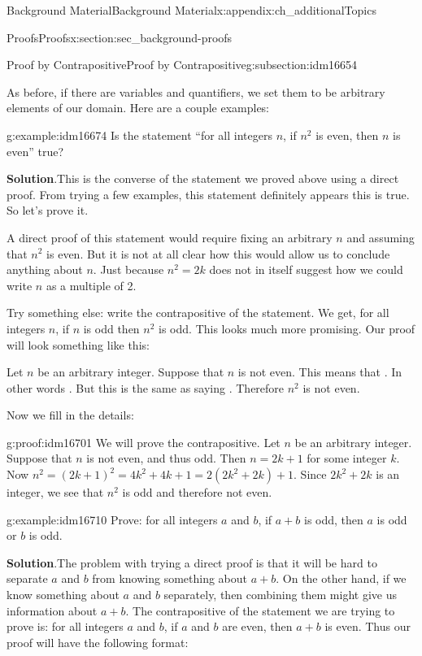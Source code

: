 \documentclass[oneside,10pt,]{book}
\numberwithin{equation}{chapter}
\begin{document}
\begin{appendixptx}{Background Material}{}{Background Material}{}{}{x:appendix:ch_additionalTopics}
\begin{sectionptx}{Proofs}{}{Proofs}{}{}{x:section:sec_background-proofs}
\begin{subsectionptx}{Proof by Contrapositive}{}{Proof by Contrapositive}{}{}{g:subsection:idm16654}
\begin{quote}
\end{quote}
As before, if there are variables and quantifiers, we set them to be arbitrary elements of our domain. Here are a couple examples:%
\begin{example}{}{g:example:idm16674}%
Is the statement ``for all integers \(n\), if \(n^2\) is even, then \(n\) is even'' true?%
\par\smallskip%
\noindent\textbf{Solution}.\hypertarget{g:solution:idm16681}{}\quad{}This is the converse of the statement we proved above using a direct proof. From trying a few examples, this statement definitely appears this is true. So let's prove it.%
\par
A direct proof of this statement would require fixing an arbitrary \(n\) and assuming that \(n^2\) is even. But it is not at all clear how this would allow us to conclude anything about \(n\). Just because \(n^2 = 2k\) does not in itself suggest how we could write \(n\) as a multiple of 2.%
\par
Try something else: write the contrapositive of the statement. We get, for all integers \(n\), if \(n\) is odd then \(n^2\) is odd. This looks much more promising. Our proof will look something like this:%
\par
Let \(n\) be an arbitrary integer. Suppose that \(n\) is not even. This means that \textellipsis{}. In other words \textellipsis{}. But this is the same as saying \textellipsis{}. Therefore \(n^2\) is not even.%
\par
Now we fill in the details:%
\begin{proofptx}{}{g:proof:idm16701}
We will prove the contrapositive. Let \(n\) be an arbitrary integer. Suppose that \(n\) is not even, and thus odd. Then \(n= 2k+1\) for some integer \(k\). Now \(n^2 = (2k+1)^2 = 4k^2 + 4k + 1 = 2(2k^2 + 2k) + 1\). Since \(2k^2 + 2k\) is an integer, we see that \(n^2\) is odd and therefore not even.%
\end{proofptx}
\end{example}
\begin{example}{}{g:example:idm16710}%
Prove: for all integers \(a\) and \(b\), if \(a + b\) is odd, then \(a\) is odd or \(b\) is odd.%
\par\smallskip%
\noindent\textbf{Solution}.\hypertarget{g:solution:idm16718}{}\quad{}The problem with trying a direct proof is that it will be hard to separate \(a\) and \(b\) from knowing something about \(a+b\). On the other hand, if we know something about \(a\) and \(b\) separately, then combining them might give us information about \(a+b\). The contrapositive of the statement we are trying to prove is: for all integers \(a\) and \(b\), if \(a\) and \(b\) are even, then \(a+b\) is even. Thus our proof will have the following format:%

\end{example}
\end{subsectionptx}
\end{sectionptx}
\end{appendixptx}
\end{document}
